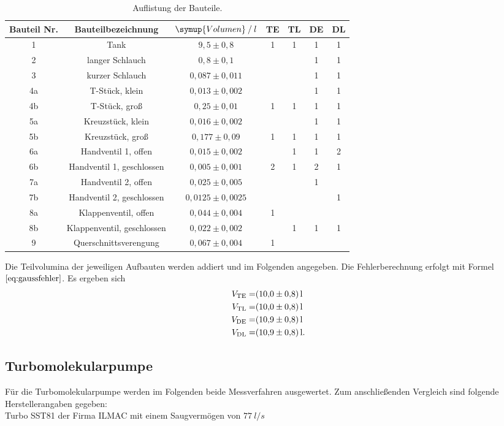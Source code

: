 \begin{table}[!hht]
	\centering
	\begin{tabular}{|c|c|c|c|c|c|c|}
		\hline
		Bauteil Nr. & Bauteilbezeichnung & {$\symup{Volumen} \:/\: l$}& TE & TL & DE & DL\\ \hline
		1	&	Tank & $9,5 \pm 0,8$ & 1 & 1 & 1 & 1 \\ \hline
		2	&	langer Schlauch & $0,8 \pm 0,1$ &  &  & 1 & 1 \\	\hline
		3	&	kurzer Schlauch & $0,087 \pm 0,011$ &  &  & 1 & 1 \\	\hline
		4a	&	T-Stück, klein & $0,013 \pm 0,002$ &  &  & 1 & 1 \\	\hline
		4b	&	T-Stück, groß & $0,25 \pm 0,01$ & 1 & 1 & 1 & 1 \\	\hline
		5a	&	Kreuzstück, klein & $0,016 \pm 0,002$ &  &  & 1 & 1 \\	\hline
		5b	&	Kreuzstück, groß & $0,177 \pm 0,09$ & 1 & 1 & 1 & 1 \\	\hline
		6a	&	Handventil 1, offen & $0,015 \pm 0,002$ &  & 1 & 1 & 2 \\	\hline
		6b	&	Handventil 1, geschlossen & $0,005 \pm 0,001$ &  2 & 1 & 2 & 1 \\	\hline
		7a	&	Handventil 2, offen & $0,025 \pm 0,005$ &  &  & 1 &  \\	\hline
		7b	&	Handventil 2, geschlossen & $0,0125 \pm 0,0025$ &  &  &  & 1 \\	\hline
		8a	&	Klappenventil, offen & $0,044 \pm 0,004$ & 1 &  &  &  \\	\hline
		8b	&	Klappenventil, geschlossen & $0,022 \pm 0,002$ &  & 1 & 1 & 1 \\	\hline
		9	&	Querschnittsverengung & $0,067 \pm 0,004$ & 1 &  &  &  \\	\hline
	\end{tabular}
	\caption{Auflistung der Bauteile.\cite{anleitung}}
	\label{tab:Bauteile}
\end{table}
Die Teilvolumina der jeweiligen Aufbauten werden addiert und im Folgenden angegeben. Die Fehlerberechnung erfolgt mit Formel $\ref{eq:gaussfehler}$.
Es ergeben sich
\begin{align*}
   V_\text{TE}=&\SI{10,0 \pm 0,8}{l}\\
   V_\text{TL}=&\SI{10,0 \pm 0,8}{l}\\
   V_\text{DE}=&\SI{10,9 \pm 0,8}{l}\\
   V_\text{DL}=&\SI{10,9 \pm 0,8}{l}.
\end{align*}

\subsection{Turbomolekularpumpe}
Für die Turbomolekularpumpe werden im Folgenden beide Messverfahren ausgewertet.
Zum anschließenden Vergleich sind folgende Herstellerangaben\cite{anleitung} gegeben:\\
Turbo SST81 der Firma ILMAC mit einem Saugvermögen von $\SI{77}{l/s}$
